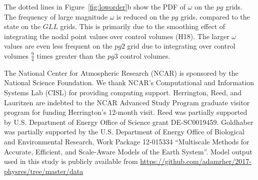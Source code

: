 \documentclass{agujournal}
\begin{document}
The dotted lines in Figure~\ref{fig:loworder}b show the PDF of $\omega$ on the $pg$ grids. The frequency of large magnitude $\omega$ is reduced on the $pg$ grids, compared to the state on the $GLL$ grids. This is primarily due to the smoothing effect of integrating the nodal point values over control volumes (H18). The larger $\omega$ values are even less frequent on the $pg2$ grid due to integrating over control volumes $\frac{9}{4}$ times greater than the $pg3$ control volumes. 


%
%
%
%
%
%
%

\acknowledgments
The National Center for Atmospheric Research (NCAR) is sponsored by the National Science Foundation.  We thank NCAR's Computational and Information Systems Lab (CISL) for providing computing support. Herrington, Reed, and Lauritzen are indebted to the NCAR Advanced Study Program graduate visitor program for funding Herrington’s 12-month visit. Reed was partially supported by U.S. Department of Energy Office of Science grant DE-SC0019459. Goldhaber was partially supported by the U.S. Department of Energy Office of Biological and Environmental Research, Work Package 12-015334 ``Multiscale Methods for Accurate, Efficient, and Scale-Aware Models of the Earth System''. Model output used in this study is publicly available from \url{https://github.com/adamrher/2017-physres/tree/master/data}



\end{document}

